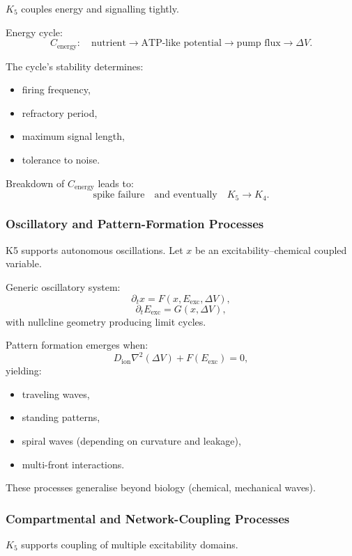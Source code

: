 $K_5$ couples energy and signalling tightly.

Energy cycle:
\[
C_{\text{energy}}:\quad
\text{nutrient} \to \text{ATP-like potential} \to
\text{pump flux} \to \Delta V.
\]

The cycle’s stability determines:
\begin{itemize}
    \item firing frequency,
    \item refractory period,
    \item maximum signal length,
    \item tolerance to noise.
\end{itemize}

Breakdown of $C_{\text{energy}}$ leads to:
\[
\text{spike failure} \quad\text{and eventually}\quad K_5 \to K_4.
\]

\subsubsection{Oscillatory and Pattern-Formation Processes}

K5 supports autonomous oscillations.
Let $x$ be an excitability–chemical coupled variable.

Generic oscillatory system:
\[
\partial_t x = F(x, E_{\text{exc}}, \Delta V),
\]
\[
\partial_t E_{\text{exc}} = G(x, \Delta V),
\]
with nullcline geometry producing limit cycles.

Pattern formation emerges when:
\[
D_{\text{ion}} \nabla^2 (\Delta V) + F(E_{\text{exc}}) = 0,
\]
yielding:
\begin{itemize}
    \item traveling waves,
    \item standing patterns,
    \item spiral waves (depending on curvature and leakage),
    \item multi-front interactions.
\end{itemize}

These processes generalise beyond biology (chemical, mechanical waves).

\subsubsection{Compartmental and Network-Coupling Processes}

$K_5$ supports coupling of multiple excitability domains.

